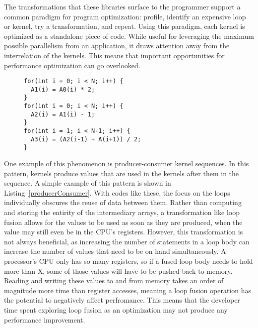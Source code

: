 The transformations that these libraries surface to the programmer support a common paradigm for program optimization: profile, identify an expensive loop or kernel, try a transformation, and repeat.
Using this paradigm, each kernel is optimized as a standalone piece of code.
While useful for leveraging the maximum possible parallelism from an application, it draws attention away from the interrelation of the kernels.
This means that important opportunities for performance optimization can go overlooked.

\begin{figure}
\begin{lstlisting}[caption={Example of a producer-consumer relationship between kernels. This relationship can be pointwise, like the first and second loops, or based on a stencil, like the third},label=producerConsumer]
for(int i = 0; i < N; i++) {
  A1(i) = A0(i) * 2;
}
for(int i = 0; i < N; i++) {
  A2(i) = A1(i) - 1;
}
for(int i = 1; i < N-1; i++) {
  A3(i) = (A2(i-1) + A(i+1)) / 2;
}
\end{lstlisting}
\end{figure}
One example of this phenomenon is producer-consumer kernel sequences.
In this pattern, kernels produce values that are used in the kernels after them in the sequence.
A simple example of this pattern is shown in Listing~\ref{producerConsumer}.
With codes like these, the focus on the loops individually obscures the reuse of data between them.
Rather than computing and storing the entirity of the intermediary arrays, a transformation like loop fusion allows for the values to be used as soon as they are produced, when the value may still even be in the CPU's registers.
However, this transformation is not always beneficial, as increasing the number of statements in a loop body can increase the number of values that need to be on hand simultaneously. 
A processor's CPU only has so many registers, so if a fused loop body needs to hold more than X, some of those values will have to be pushed back to memory. 
Reading and writing these values to and from memory takes an order of magnitude more time than register accesses, meaning a loop fusion operation has the potential to negatively affect perfromance.
This means that the developer time spent exploring loop fusion as an optimization may not produce any performance improvement.

